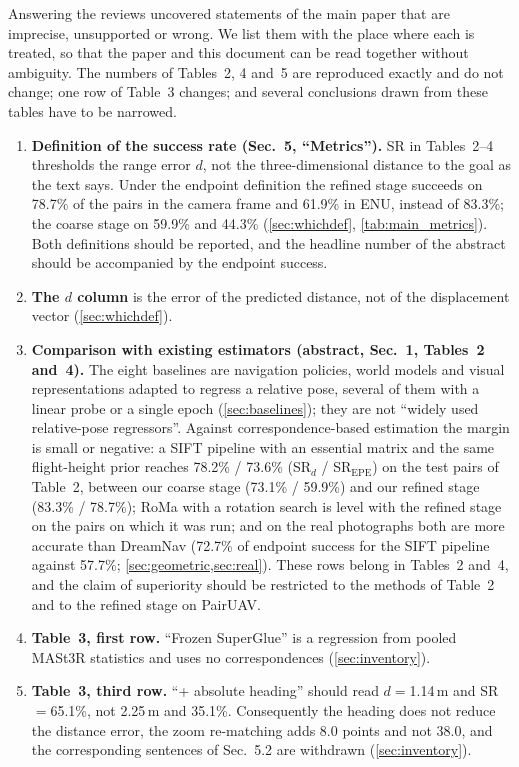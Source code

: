 \documentclass[10pt,twocolumn,letterpaper]{article}
\newcommand{\SRd}{SR$_{d}$}
\newcommand{\SRe}{SR$_{\mathrm{EPE}}$}
\begin{document}
Answering the reviews uncovered statements of the main paper that are imprecise, unsupported or wrong. We list them with the place where each is treated, so that the paper and this document can be read together without ambiguity. The numbers of Tables~2, 4 and~5 are reproduced exactly and do not change; one row of Table~3 changes; and several conclusions drawn from these tables have to be narrowed.

\begin{enumerate}[leftmargin=*,itemsep=2pt,topsep=3pt]
\item \textbf{Definition of the success rate (Sec.~5, ``Metrics'').} SR in Tables~2--4 thresholds the range error $d$, not the three-dimensional distance to the goal as the text says. Under the endpoint definition the refined stage succeeds on 78.7\% of the pairs in the camera frame and 61.9\% in ENU, instead of 83.3\%; the coarse stage on 59.9\% and 44.3\% (\cref{sec:whichdef}, \cref{tab:main_metrics}). Both definitions should be reported, and the headline number of the abstract should be accompanied by the endpoint success.
\item \textbf{The $d$ column} is the error of the predicted distance, not of the displacement vector (\cref{sec:whichdef}).
\item \textbf{Comparison with existing estimators (abstract, Sec.~1, Tables~2 and~4).} The eight baselines are navigation policies, world models and visual representations adapted to regress a relative pose, several of them with a linear probe or a single epoch (\cref{sec:baselines}); they are not ``widely used relative-pose regressors''. Against correspondence-based estimation the margin is small or negative: a SIFT pipeline with an essential matrix and the same flight-height prior reaches 78.2\% / 73.6\% (\SRd{} / \SRe) on the test pairs of Table~2, between our coarse stage (73.1\% / 59.9\%) and our refined stage (83.3\% / 78.7\%); RoMa with a rotation search is level with the refined stage on the pairs on which it was run; and on the real photographs both are more accurate than DreamNav (72.7\% of endpoint success for the SIFT pipeline against 57.7\%; \cref{sec:geometric,sec:real}). These rows belong in Tables~2 and~4, and the claim of superiority should be restricted to the methods of Table~2 and to the refined stage on PairUAV.
\item \textbf{Table~3, first row.} ``Frozen SuperGlue'' is a regression from pooled MASt3R statistics and uses no correspondences (\cref{sec:inventory}).
\item \textbf{Table~3, third row.} ``+ absolute heading'' should read $d{=}$1.14\,m and SR${=}$65.1\%, not 2.25\,m and 35.1\%. Consequently the heading does not reduce the distance error, the zoom re-matching adds 8.0 points and not 38.0, and the corresponding sentences of Sec.~5.2 are withdrawn (\cref{sec:inventory}).

\end{enumerate}
\end{document}
